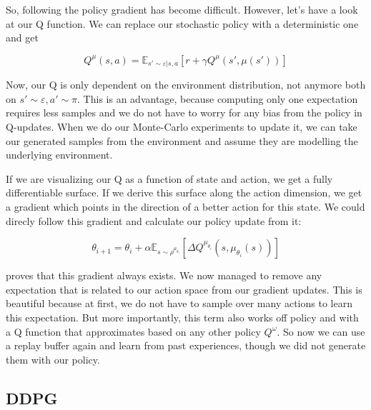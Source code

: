 \documentclass[hyperref,german,beleg]{cgvpub}
\begin{document}
So, following the policy gradient has become difficult. However, let's have a look at our Q function. We can replace our stochastic policy with a deterministic one and get

\begin{equation}
Q^{\mu}(s,a) = \mathbb{E}_{s' \sim \varepsilon | s,a}[r + \gamma Q^{\mu}(s', \mu(s'))]
\end{equation}

Now, our Q is only dependent on the environment distribution, not anymore both on $s' \sim \varepsilon, a' \sim \pi$. This is an advantage, because computing only one expectation requires less samples and we do not have to worry for any bias from the policy in Q-updates. When we do our Monte-Carlo experiments to update it, we can take our generated samples from the environment and assume they are modelling the underlying environment.

If we are visualizing our Q as a function of state and action, we get a fully differentiable surface. If we derive this surface along the action dimension, we get a gradient which points in the direction of a better action for this state. We could direcly follow this gradient and calculate our policy update from it:

\begin{equation}
\theta_{i+1} = \theta_i + \alpha \mathbb{E}_{s \sim \rho^{\mu_{\theta_i}}}[\Delta Q^{\mu_{\theta_i}}(s, \mu_{\theta_i}(s))]
\end{equation}

\cite[Theorem 1]{silverDeterministicPolicyGradient2013} proves that this gradient always exists. We now managed to remove any expectation that is related to our action space from our gradient updates. This is beautiful because at first, we do not have to sample over many actions to learn this expectation. But more importantly, this term also works off policy \cite[Section 4.2]{silverDeterministicPolicyGradient2013} and with a Q function that approximates based on any other policy $Q^{\omega}$. So now we can use a replay buffer again and learn from past experiences, though we did not generate them with our policy.

\subsection{DDPG}
\end{document}
